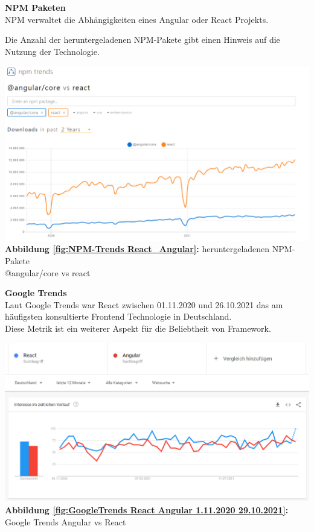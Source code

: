 {\cite{GH04, GH06}}%


\textbf{NPM Paketen}\\
NPM verwaltet die Abhängigkeiten eines Angular oder React Projekts.

Die Anzahl der heruntergeladenen NPM-Pakete gibt einen Hinweis auf die Nutzung der Technologie.

\begin{center}
  \includegraphics[scale=0.4]
  {sources/NPM-Trends React_Angular}\label{fig:NPM-Trends React_Angular}\\
  \textbf{Abbildung \autoref{fig:NPM-Trends React_Angular}:} heruntergeladenen NPM-Pakete \\@angular/core vs react
    {\cite{NPM01}}
\end{center}

\textbf{Google Trends}\\
Laut Google Trends war React zwischen 01.11.2020 und 26.10.2021 das am häufigsten konsultierte Frontend Technologie in Deutschland.
\\
Diese Metrik ist ein weiterer Aspekt für die Beliebtheit von Framework.
\begin{center}
  \includegraphics[scale=0.5]
  {sources/GoogleTrends React Angular 1.11.2020 29.10.2021}\label{fig:GoogleTrends React Angular 1.11.2020 29.10.2021}\\
  \textbf{Abbildung \autoref{fig:GoogleTrends React Angular 1.11.2020 29.10.2021}:} Google Trends Angular vs React 
    {\cite{GO01}}
\end{center}

